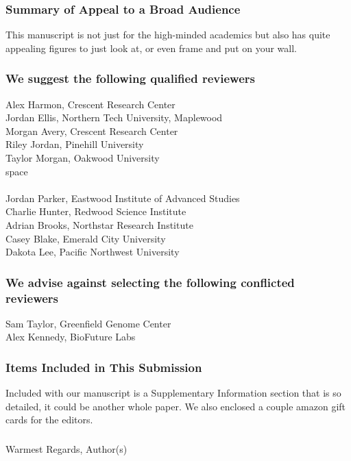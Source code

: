 \documentclass[11pt]{article}
\begin{document}
\subsubsection*{Summary of Appeal to a Broad Audience}
\noindent This manuscript is not just for the high-minded academics but also has quite appealing figures to just look at, or even frame and put on your wall.
\subsubsection*{We suggest the following qualified reviewers}
\begin{multicols}{2}

\noindent Alex Harmon, Crescent Research Center\\
Jordan Ellis, Northern Tech University, Maplewood\\
Morgan Avery, Crescent Research Center\\
Riley Jordan, Pinehill University\\ 
Taylor Morgan, Oakwood University\\
{\color{white} space \\}\\
Jordan Parker, Eastwood Institute of Advanced Studies\\ 
Charlie Hunter, Redwood Science Institute\\ Adrian Brooks, Northstar Research Institute\\
Casey Blake, Emerald City University\\
Dakota Lee, Pacific Northwest University\\
\end{multicols}
\vspace{-0.75cm}
\subsubsection*{We advise against selecting the following conflicted reviewers}
\noindent Sam Taylor, Greenfield Genome Center\\
Alex Kennedy, BioFuture Labs

\subsubsection{Items Included in This Submission}
\noindent Included with our manuscript is a Supplementary Information section that is so detailed, it could be another whole paper. We also enclosed a couple amazon gift cards for the editors. 

%
\subsubsection{}
Warmest Regards,
\newline
Author(s)
\end{document}
